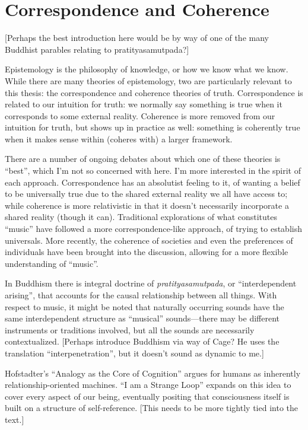 \documentclass{thesis}
\begin{document}
\section{Correspondence and Coherence}
	[Perhaps the best introduction here would be by way of one of the many Buddhist parables relating to pratityasamutpada?]

	Epistemology is the philosophy of knowledge, or how we know what we know.\cite{Blackburn07} While there are many theories of epistemology, two are particularly relevant to this thesis: the correspondence\cite{david_correspondence_????} and coherence\cite{young_coherence_????} theories of truth. Correspondence is related to our intuition for truth: we normally say something is true when it corresponds to some external reality. Coherence is more removed from our intuition for truth, but shows up in practice as well: something is coherently true when it makes sense within (coheres with) a larger framework.
	
	There are a number of ongoing debates about which one of these theories is ``best'', which I'm not so concerned with here. I'm more interested in the spirit of each approach. Correspondence has an absolutist feeling to it, of wanting a belief to be universally true due to the shared external reality we all have access to; while coherence is more relativistic in that it doesn't necessarily incorporate a shared reality (though it can). Traditional explorations of what constitutes ``music'' have followed a more correspondence-like approach, of trying to establish universals. More recently, the coherence of societies and even the preferences of individuals have been brought into the discussion, allowing for a more flexible understanding of ``music''.

	In Buddhism there is integral doctrine of \emph{pratityasamutpada}, or ``interdependent arising'', that accounts for the causal relationship between all things.\cite{Koller01} With respect to music, it might be noted that naturally occurring sounds have the same interdependent structure as ``musical'' sounds---there may be different instruments or traditions involved, but all the sounds are necessarily contextualized. [Perhaps introduce Buddhism via way of Cage? He uses the translation ``interpenetration'', but it doesn't sound as dynamic to me.]

	Hofstadter's ``Analogy as the Core of Cognition''\cite{Hofstadter01} argues for humans as inherently relationship-oriented machines. ``I am a Strange Loop''\cite{Hofstadter07} expands on this idea to cover every aspect of our being, eventually positing that consciousness itself is built on a structure of self-reference. [This needs to be more tightly tied into the text.]
\end{document}
